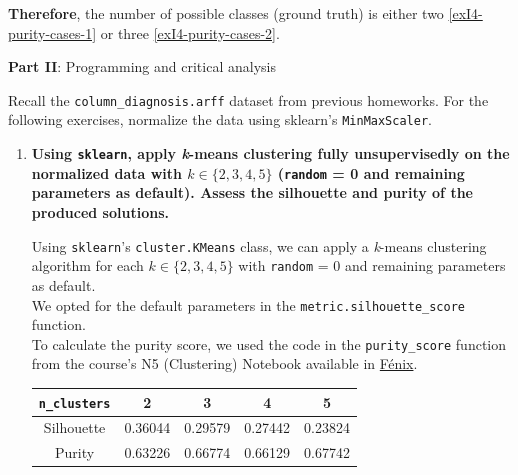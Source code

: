 \documentclass[12pt]{article}
\begin{document}
\begin{enumerate}[leftmargin=\labelsep]
        \textbf{Therefore}, the number of possible classes (ground truth) is either two \eqref{exI4-purity-cases-1} or three \eqref{exI4-purity-cases-2}.
\end{enumerate}

\vskip 0.5cm

\begin{center}
  \large{\textbf{Part II}: Programming and critical analysis}\normalsize
\end{center}

\noindent Recall the \texttt{column\_diagnosis.arff} dataset from previous homeworks. For the following exercises,
normalize the data using sklearn's \texttt{MinMaxScaler}.

\begin{enumerate}[leftmargin=\labelsep]
  \item \textbf{Using \texttt{sklearn}, apply \textit{k}-means clustering fully unsupervisedly on the normalized data with
          $k \in \{2,3,4,5\}$ (\textnormal{\texttt{random} = 0} and remaining parameters as default).
          Assess the silhouette and purity of the produced solutions.}

        \vskip 0.3cm
        Using \texttt{sklearn}'s \texttt{cluster.KMeans} class, we can apply a \textit{k}-means clustering algorithm
        for each $k \in \{2,3,4,5\}$ with \texttt{random} = 0 and remaining parameters as default. \\
        We opted for the default parameters in the \texttt{metric.silhouette\_score} function. \\
        To calculate the purity score, we used the code in the \texttt{purity\_score} function from the
        course's N5 (Clustering) Notebook available in
        \href{https://fenix.tecnico.ulisboa.pt/disciplinas/Apre2/2023-2024/1-semestre/notebooks}{Fénix}.

        

        \begin{center}
          \captionsetup{type=table}
          \begin{tabular}{c|cccc}
            \texttt{n\_clusters} & 2       & 3       & 4       & 5       \\
            \hline
            Silhouette           & 0.36044 & 0.29579 & 0.27442 & 0.23824 \\
            Purity               & 0.63226 & 0.66774 & 0.66129 & 0.67742
          \end{tabular}
          \label{exII1-silhouette-purity}
        \end{center}


\end{enumerate}
\end{document}

